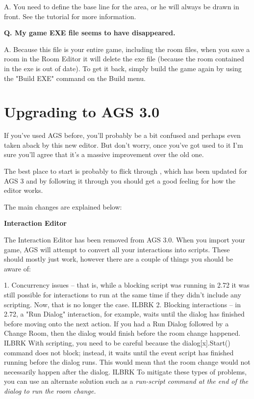 A. You need to define the base line for the area, or he will always be drawn
   in front. See the tutorial for more information.

\bf{Q. My game EXE file seems to have disappeared.}

A. Because this file is your entire game, including the room files, when you
   save a room in the Room Editor it will delete the exe file (because the
   room contained in the exe is out of date). To get it back, simply build the
   game again by using the "Build EXE" command on the Build menu.



\chapter{Upgrading to AGS 3.0}\label{UpgradeTo30}%

If you've used AGS before, you'll probably be a bit confused and perhaps even
taken aback by this new editor. But don't worry, once you've got used to it
I'm sure you'll agree that it's a massive improvement over the old one.

The best place to start is probably to flick through ,
which has been updated for AGS 3 and by following it through you should
get a good feeling for how the editor works.

The main changes are explained below:

\bf{Interaction Editor}

The Interaction Editor has been removed from AGS 3.0. When you import your game, AGS
will attempt to convert all your interactions into scripts. These should mostly
just work, however there are a couple of things you should be aware of:

1. Concurrency issues -- that is, while a blocking script was running in 2.72
it was still possible for interactions to run at the same time if they didn't
include any scripting. Now, that is no longer the case. ILBRK
2. Blocking interactions -- in 2.72, a "Run Dialog" interaction, for example,
waits until the dialog has finished before moving onto the next action. If you
had a Run Dialog followed by a Change Room, then the dialog would finish before
the room change happened. ILBRK
With scripting, you need to be careful because the dialog[x].Start() command
does not block; instead, it waits until the event script has finished running
before the dialog runs. This would mean that the room change would not
necessarily happen after the dialog. ILBRK
To mitigate these types of problems, you can use an alternate solution such
as a \it{run-script} command at the end of the dialog to run the room change.

